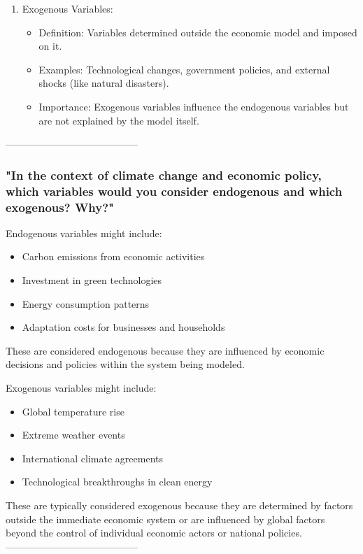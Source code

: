 \documentclass[10pt]{article}
\begin{document}
\begin{enumerate}
\begin{enumerate}
  \item Exogenous Variables:

    \begin{itemize}
      \item Definition: Variables determined outside the economic model and imposed on it.
      \item Examples: Technological changes, government policies, and external shocks (like natural disasters).
      \item Importance: Exogenous variables influence the endogenous variables but are not explained by the model itself.
    \end{itemize}
\end{enumerate}

-----------------------------------------
\subsubsection*{"In the context of climate change and economic policy, which variables would you consider endogenous and which exogenous? Why?"}
Endogenous variables might include:

\begin{itemize}
  \item Carbon emissions from economic activities
  \item Investment in green technologies
  \item Energy consumption patterns
  \item Adaptation costs for businesses and households
\end{itemize}

These are considered endogenous because they are influenced by economic decisions and policies within the system being modeled.

Exogenous variables might include:

\begin{itemize}
  \item Global temperature rise
  \item Extreme weather events
  \item International climate agreements
  \item Technological breakthroughs in clean energy
\end{itemize}

These are typically considered exogenous because they are determined by factors outside the immediate economic system or are influenced by global factors beyond the control of individual economic actors or national policies.
-----------------------------------------


\end{enumerate}
\end{document}

